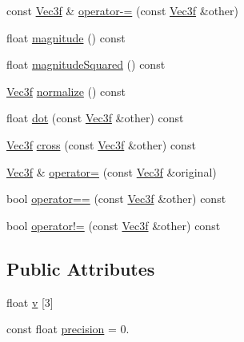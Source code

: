 \begin{DoxyCompactItemize}
\item 
const \hyperlink{class_vec3f}{Vec3f} \& \hyperlink{class_vec3f_a22376a2e23c90ba8119b7c475d2a0583}{operator-\/=} (const \hyperlink{class_vec3f}{Vec3f} \&other)
\item 
float \hyperlink{class_vec3f_af736ea593ed963c40c8776d4014d4e79}{magnitude} () const 
\item 
float \hyperlink{class_vec3f_aa4cc7ae415806c6b831218fde0624598}{magnitude\+Squared} () const 
\item 
\hyperlink{class_vec3f}{Vec3f} \hyperlink{class_vec3f_a7532bd9c039aee160a7347e63ef07217}{normalize} () const 
\item 
float \hyperlink{class_vec3f_a4be996396b524f4f55c50a2cb2a80809}{dot} (const \hyperlink{class_vec3f}{Vec3f} \&other) const 
\item 
\hyperlink{class_vec3f}{Vec3f} \hyperlink{class_vec3f_adf78d471e54893a6ef8031f1dfb83dff}{cross} (const \hyperlink{class_vec3f}{Vec3f} \&other) const 
\item 
\hyperlink{class_vec3f}{Vec3f} \& \hyperlink{class_vec3f_acdfbaa6eb50d32130ec43572cecd6ca9}{operator=} (const \hyperlink{class_vec3f}{Vec3f} \&original)
\item 
bool \hyperlink{class_vec3f_a8b2a161264d6ce9882e216636454fe6e}{operator==} (const \hyperlink{class_vec3f}{Vec3f} \&other) const 
\item 
bool \hyperlink{class_vec3f_a3953560eda8c5513247e59e00dc96fd8}{operator!=} (const \hyperlink{class_vec3f}{Vec3f} \&other) const 
\end{DoxyCompactItemize}
\subsection*{Public Attributes}
\begin{DoxyCompactItemize}
\item 
float \hyperlink{class_vec3f_afa0e0436144050846e8b8ab3e769f08c}{v} \mbox{[}3\mbox{]}
\item 
const float \hyperlink{class_vec3f_a1b5b4e544cc80cab1649a3b6f5cb4cd1}{precision} = 0.
\end{DoxyCompactItemize}


